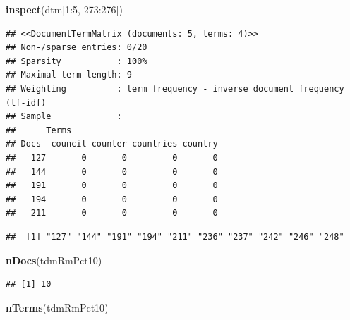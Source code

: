 \documentclass[]{book}
\newenvironment{Shaded}{\begin{snugshade}}{\end{snugshade}}
\newcommand{\KeywordTok}[1]{\textcolor[rgb]{0.13,0.29,0.53}{\textbf{{#1}}}}
\newcommand{\DataTypeTok}[1]{\textcolor[rgb]{0.13,0.29,0.53}{{#1}}}
\newcommand{\DecValTok}[1]{\textcolor[rgb]{0.00,0.00,0.81}{{#1}}}
\newcommand{\StringTok}[1]{\textcolor[rgb]{0.31,0.60,0.02}{{#1}}}
\newcommand{\CommentTok}[1]{\textcolor[rgb]{0.56,0.35,0.01}{\textit{{#1}}}}
\newcommand{\OtherTok}[1]{\textcolor[rgb]{0.56,0.35,0.01}{{#1}}}
\newcommand{\NormalTok}[1]{{#1}}
\begin{document}
\begin{Shaded}
\begin{Highlighting}[]
\KeywordTok{inspect}\NormalTok{(dtm[}\DecValTok{1}\NormalTok{:}\DecValTok{5}\NormalTok{, }\DecValTok{273}\NormalTok{:}\DecValTok{276}\NormalTok{])}
\end{Highlighting}
\end{Shaded}

\begin{verbatim}
## <<DocumentTermMatrix (documents: 5, terms: 4)>>
## Non-/sparse entries: 0/20
## Sparsity           : 100%
## Maximal term length: 9
## Weighting          : term frequency - inverse document frequency (tf-idf)
## Sample             :
##      Terms
## Docs  council counter countries country
##   127       0       0         0       0
##   144       0       0         0       0
##   191       0       0         0       0
##   194       0       0         0       0
##   211       0       0         0       0
\end{verbatim}

\begin{Shaded}
\end{Shaded}

\begin{verbatim}
##  [1] "127" "144" "191" "194" "211" "236" "237" "242" "246" "248"
\end{verbatim}

\begin{Shaded}
\begin{Highlighting}[]
\KeywordTok{nDocs}\NormalTok{(tdmRmPct10)}
\end{Highlighting}
\end{Shaded}

\begin{verbatim}
## [1] 10
\end{verbatim}

\begin{Shaded}
\begin{Highlighting}[]
\KeywordTok{nTerms}\NormalTok{(tdmRmPct10)}
\end{Highlighting}
\end{Shaded}
\end{document}
